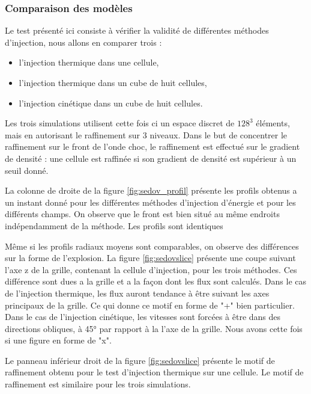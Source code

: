 \subsubsection{Comparaison des modèles}

Le test présenté ici consiste à vérifier la validité de différentes méthodes d'injection, nous allons en comparer trois : 
\begin{itemize}
\item l'injection thermique dans une cellule,
\item l'injection thermique dans un cube de huit cellules,
\item l'injection cinétique dans un cube de huit cellules.
\end{itemize}

Les trois simulations utilisent cette fois ci un espace discret de $128^3$ éléments, mais en autorisant le raffinement sur 3 niveaux.
Dans le but de concentrer le raffinement sur le front de l'onde choc, le raffinement est effectué sur le gradient de densité : une cellule est raffinée si son gradient de densité est supérieur à un seuil donné.

La colonne de droite de la figure \ref{fig:sedov_profil} présente les profils obtenus a un instant donné pour les différentes méthodes d'injection d'énergie et pour les différents champs.
On observe que le front est bien situé au même endroits indépendamment de la méthode.
Les profils sont identiques 

Même si les profils radiaux moyens sont comparables, on observe des différences sur la forme de l'explosion.
La figure \ref{fig:sedovslice} présente une coupe suivant l'axe z de la grille, contenant la cellule d'injection, pour les trois méthodes.
Ces différence sont dues a la grille et a la façon dont les flux sont calculés.
Dans le cas de l'injection thermique, les flux auront tendance à être suivant les axes principaux de la grille.
Ce qui donne ce motif en forme de "+" bien particulier.
Dans le cas de l'injection cinétique, les vitesses sont forcées à être dans des directions obliques, à 45° par rapport à la l'axe de la grille.
Nous avons cette fois si une figure en forme de "x".

Le panneau inférieur droit de la figure \ref{fig:sedovslice} présente le motif de raffinement obtenu pour le test d'injection thermique sur une cellule.
Le motif de raffinement est similaire pour les trois simulations.

